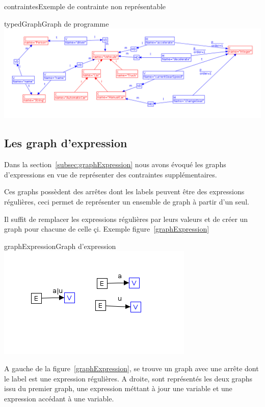 \documentclass[a4paper, 12pt]{article}
\begin{document}
\begin{figu}{contraintes}{Exemple de contrainte non représentable}
  \begin{myfig}{typedGraph}{Graph de programme}
    \includegraphics[width=\textwidth]{typedGraph.png}
  \end{myfig}

  \subsection{Les graph d'expression}

  Dans la section~\ref{subsec:graphExpression} nous avons évoqué les graphs d'expressions en vue de représenter des contraintes supplémentaires.

  Ces graphs possèdent des arrêtes dont les labels peuvent être des expressions régulières, ceci permet de représenter un ensemble de graph à partir d'un seul.

  Il suffit de remplacer les expressions régulières par leurs valeurs et de créer un graph pour chacune de celle çi. Exemple figure~\ref{graphExpression}

  \begin{myfig}{graphExpression}{Graph d'expression}
    \includegraphics{graphExpression.png}
  \end{myfig}

  A gauche de la figure~\ref{graphExpression}, se trouve un graph avec une arrête dont le label est une expression régulières.
  A droite, sont représentés les deux graphs issu du premier graph, une expression méttant à jour une variable et une expression accédant à une variable.


\end{figu}
\end{document}
